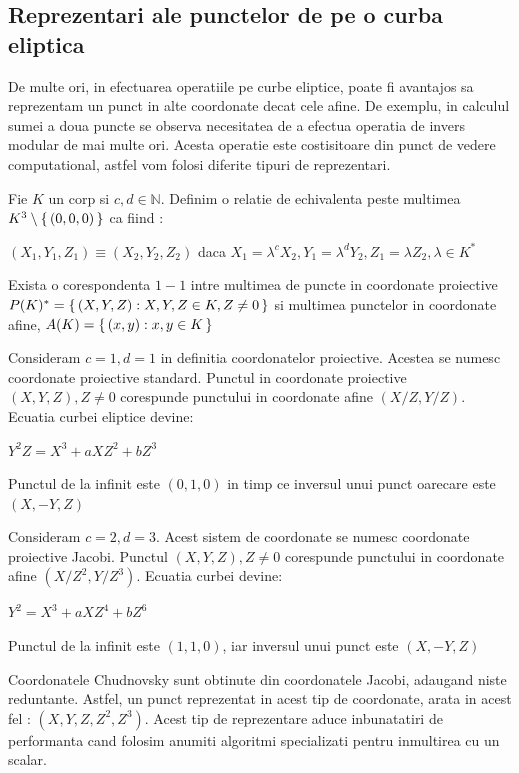 \subsection{Reprezentari ale punctelor de pe o curba eliptica}
\label{subsec:subsec02}
De multe ori, in efectuarea operatiile pe curbe eliptice, poate fi avantajos sa reprezentam un punct in alte coordonate decat cele afine. De exemplu, in calculul sumei a doua puncte se observa necesitatea de a efectua operatia de invers modular de mai multe ori. Acesta operatie este costisitoare din punct de vedere computational, astfel vom folosi diferite tipuri de reprezentari.
\begin{dfn}
Fie $K$ un corp si $c, d\in \mathbb{N}$. Definim o relatie de echivalenta peste multimea $K^3\setminus \set {(0, 0, 0)}$ ca fiind :
\begin{center} $(X_1, Y_1, Z_1) \equiv (X_2, Y_2, Z_2)$ daca $X_1 = \lambda ^cX_2, Y_1 = \lambda ^d Y_2, Z_1 = \lambda Z_2, \lambda\in K^{*}$\end{center}
Exista o corespondenta $1-1$ intre multimea de puncte in coordonate proiective $P(K)^{*} = \set {(X, Y, Z): X, Y, Z\in K, Z\neq 0}$ si multimea punctelor in coordonate afine, $A(K) = \set {(x, y): x, y\in K}$
\end{dfn}
\begin{dfn}
Consideram $c=1, d=1$ in definitia coordonatelor proiective. Acestea se numesc coordonate proiective standard. Punctul in coordonate proiective $(X, Y, Z), Z\neq 0$ corespunde punctului in coordonate afine $(X/Z, Y/Z)$. Ecuatia curbei eliptice devine:
\begin{center}  $Y^2Z = X^3 + aXZ^2 + bZ^3$ \end{center}
Punctul de la infinit este $(0, 1, 0)$ in timp ce inversul unui punct oarecare este $(X, -Y, Z)$
\end{dfn}
\begin{dfn}
Consideram $c=2, d=3$. Acest sistem de coordonate se numesc coordonate proiective Jacobi. Punctul $(X, Y, Z), Z\neq 0$ corespunde punctului 
in coordonate afine $(X/Z^2, Y/Z^3)$. Ecuatia curbei devine:
\begin{center} $Y^2 = X^3 + aXZ^4 + bZ^6$ \end{center}
Punctul de la infinit este $(1, 1, 0)$, iar inversul unui punct este $(X, -Y, Z)$
\end{dfn}
\begin{dfn}
Coordonatele Chudnovsky sunt obtinute din coordonatele Jacobi, adaugand niste reduntante. Astfel, un punct reprezentat in acest tip de coordonate, arata in acest fel : $(X, Y, Z, Z^2, Z^3)$. Acest tip de reprezentare aduce inbunatatiri de performanta cand folosim anumiti algoritmi specializati pentru inmultirea cu un scalar.
\end{dfn}

